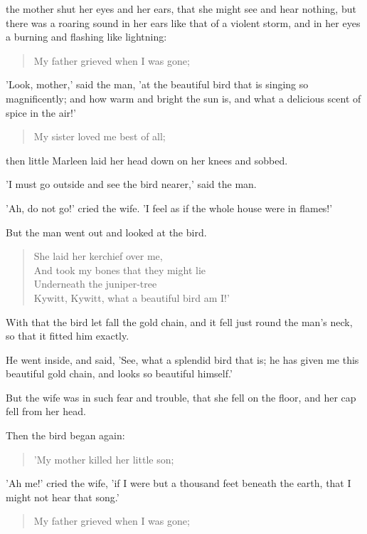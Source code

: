 \documentclass[12pt]{book}
\begin{document}
the mother shut her eyes and her ears, that she might see and hear
nothing, but there was a roaring sound in her ears like that of a
violent storm, and in her eyes a burning and flashing like lightning:

\begin{verse}
  My father grieved when I was gone;
\end{verse}

'Look, mother,' said the man, 'at the beautiful bird that is singing
so magnificently; and how warm and bright the sun is, and what a
delicious scent of spice in the air!'

\begin{verse}
  My sister loved me best of all;
\end{verse}

then little Marleen laid her head down on her knees and sobbed.

'I must go outside and see the bird nearer,' said the man.

'Ah, do not go!' cried the wife. 'I feel as if the whole house were in
flames!'

But the man went out and looked at the bird.

\begin{verse}
 She laid her kerchief over me,\\
 And took my bones that they might lie\\
 Underneath the juniper-tree\\
 Kywitt, Kywitt, what a beautiful bird am I!'
\end{verse}

With that the bird let fall the gold chain, and it fell just round the
man's neck, so that it fitted him exactly.

He went inside, and said, 'See, what a splendid bird that is; he has
given me this beautiful gold chain, and looks so beautiful himself.'

But the wife was in such fear and trouble, that she fell on the floor,
and her cap fell from her head.

Then the bird began again:

\begin{verse}
 'My mother killed her little son;
\end{verse}

'Ah me!' cried the wife, 'if I were but a thousand feet beneath the
earth, that I might not hear that song.'

\begin{verse}
  My father grieved when I was gone;
\end{verse}
\end{document}
